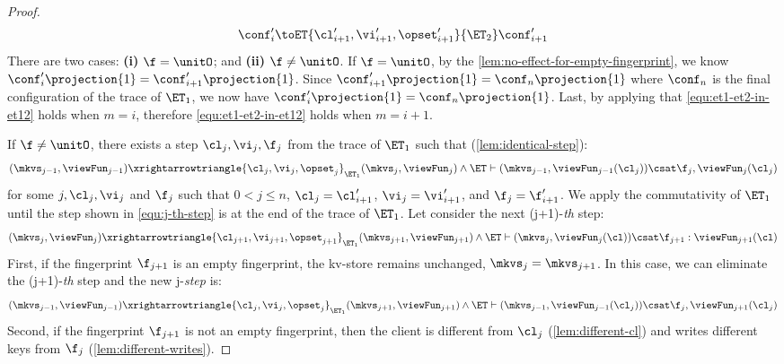 \begin{proof}
\begin{equation}
    \label{equ:last-et-2}
    \conf'_i \toET{\cl'_{i+1}, \vi'_{i+1}, \opset'_{i+1}}{\ET_2} \conf'_{i+1}
\end{equation}
There are two cases: \textbf{(i)} \( \f = \unitO \); and \textbf{(ii)} \( \f \neq \unitO \).
If \( \f = \unitO \), by the \cref{lem:no-effect-for-empty-fingerprint}, we know \( \conf'_{i}\projection{1} = \conf'_{i+1}\projection{1}\).
Since \( \conf'_{i+1}\projection{1} = \conf_n\projection{1}\) where \( \conf_n \) is the final configuration of the trace of \( \ET_1 \), we now have \( \conf'_{i}\projection{1} = \conf_n\projection{1}\).
Last, by applying \ih that \cref{equ:et1-et2-in-et12} holds when \( m = i \), therefore \cref{equ:et1-et2-in-et12} holds when \( m = i + 1\).

If \( \f \neq \unitO \), there exists a step \( \cl_j, \vi_j, \f_j \) from the trace of \( \ET_1 \) such that (\cref{lem:identical-step}):
\begin{equation}
    \label{equ:j-th-step}
    (\mkvs_{j-1}, \viewFun_{j-1}) \xrightarrowtriangle{\cl_{j}, \vi_{j}, \opset_{j}}_{\ET_1} (\mkvs_j, \viewFun_j) \land \ET \vdash (\mkvs_{j-1}, \viewFun_{j-1}(\cl_j)) \csat \f_j, \viewFun_j(\cl_j)
\end{equation}
for some \( j, \cl_j, \vi_j\) and \( \f_j \) such that \( 0 <  j \leq n \), \( \cl_j = \cl'_{i+1}\), \( \vi_j = \vi'_{i+1}\), and \( \f_j = \f'_{i+1}\).
We apply the commutativity of \( \ET_1 \) until the step shown in \cref{equ:j-th-step} is at the end of the trace of \( \ET_1 \).
Let consider the next (j+1)-\emph{th} step:
\begin{equation}
    \label{equ:j-plus-1-th-step}
    (\mkvs_j, \viewFun_j) \xrightarrowtriangle{\cl_{j+1}, \vi_{j+1}, \opset_{j+1}}_{\ET_1} (\mkvs_{j+1}, \viewFun_{j+1}) \land \ET \vdash (\mkvs_j,\viewFun_j(\cl)) \csat \f_{j+1} : \viewFun_{j+1}(\cl) 
\end{equation}
First, if the fingerprint \( \f_{j+1} \) is an empty fingerprint, the kv-store remains unchanged, \ie \( \mkvs_j = \mkvs_{j+1} \).
In this case, we can eliminate the (j+1)-\emph{th} step and the new j-\emph{step} is:
\[
    (\mkvs_{j-1}, \viewFun_{j-1}) \xrightarrowtriangle{\cl_{j}, \vi_{j}, \opset_{j}}_{\ET_1} (\mkvs_{j+1}, \viewFun_{j+1}) \land \ET \vdash (\mkvs_{j-1}, \viewFun_{j-1}(\cl_j)) \csat \f_j, \viewFun_{j+1}(\cl_j)
\]
Second, if the fingerprint \( \f_{j+1} \) is not an empty fingerprint, then the client is different from \( \cl_j \) (\cref{lem:different-cl}) and writes different keys from \( \f_j\) (\cref{lem:different-writes}). 

\end{proof}
